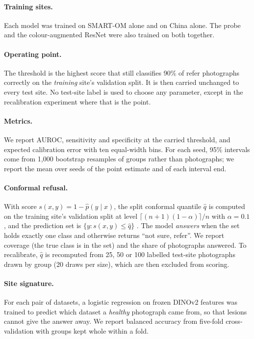 \documentclass[11pt]{article}
\begin{document}
\paragraph{Training sites.} Each model was trained on SMART-OM alone and on China alone. The probe and the colour-augmented ResNet were also trained on both together.

\paragraph{Operating point.} The threshold is the highest score that still classifies 90\% of refer photographs correctly on the \emph{training} site's validation split. It is then carried unchanged to every test site. No test-site label is used to choose any parameter, except in the recalibration experiment where that is the point.

\paragraph{Metrics.} We report AUROC, sensitivity and specificity at the carried threshold, and expected calibration error with ten equal-width bins. For each seed, 95\% intervals come from 1{,}000 bootstrap resamples of groups rather than photographs; we report the mean over seeds of the point estimate and of each interval end.

\paragraph{Conformal refusal.} With score $s(x, y) = 1 - \hat p(y \mid x)$, the split conformal quantile $\hat q$ is computed on the training site's validation split at level $\lceil (n+1)(1-\alpha) \rceil / n$ with $\alpha = 0.1$, and the prediction set is $\{y : s(x, y) \le \hat q\}$ \citep{angelopoulos2021gentle}. The model \emph{answers} when the set holds exactly one class and otherwise returns ``not sure, refer''. We report coverage (the true class is in the set) and the share of photographs answered. To recalibrate, $\hat q$ is recomputed from 25, 50 or 100 labelled test-site photographs drawn by group (20 draws per size), which are then excluded from scoring.

\paragraph{Site signature.} For each pair of datasets, a logistic regression on frozen DINOv2 features was trained to predict which dataset a \emph{healthy} photograph came from, so that lesions cannot give the answer away. We report balanced accuracy from five-fold cross-validation with groups kept whole within a fold.
\end{document}
